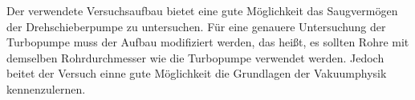 Der verwendete Versuchsaufbau bietet eine gute Möglichkeit das Saugvermögen der Drehschieberpumpe zu untersuchen.
Für eine genauere Untersuchung der Turbopumpe muss der Aufbau modifiziert werden, das heißt, es sollten Rohre mit
demselben Rohrdurchmesser wie die Turbopumpe verwendet werden. 
Jedoch beitet der Versuch einne gute Möglichkeit die Grundlagen der Vakuumphysik kennenzulernen. 


